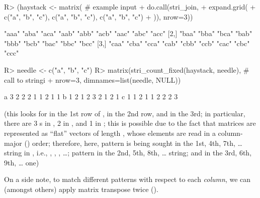 \documentclass[nojss]{jss}
\begin{document}
\begin{itemize}
\begin{Schunk}
\begin{Sinput}
R> (haystack <- matrix(  # example input
+    do.call(stri_join,
+      expand.grid(
+        c("a", "b", "c"), c("a", "b", "c"), c("a", "b", "c")
+      )), nrow=3))
\end{Sinput}
\begin{Soutput}
     [,1]  [,2]  [,3]  [,4]  [,5]  [,6]  [,7]  [,8]  [,9]
[1,] "aaa" "aba" "aca" "aab" "abb" "acb" "aac" "abc" "acc"
[2,] "baa" "bba" "bca" "bab" "bbb" "bcb" "bac" "bbc" "bcc"
[3,] "caa" "cba" "cca" "cab" "cbb" "ccb" "cac" "cbc" "ccc"
\end{Soutput}
\begin{Sinput}
R> needle <- c("a", "b", "c")
R> matrix(stri_count_fixed(haystack, needle),  # call to stringi
+    nrow=3, dimnames=list(needle, NULL))
\end{Sinput}
\begin{Soutput}
  [,1] [,2] [,3] [,4] [,5] [,6] [,7] [,8] [,9]
a    3    2    2    2    1    1    2    1    1
b    1    2    1    2    3    2    1    2    1
c    1    1    2    1    1    2    2    2    3
\end{Soutput}
\end{Schunk}

(this looks for  in the 1st row of
,  in the 2nd row, and  in the 3rd;
in particular, there are 3 s in , 2 in ,
and 1  in ;
this is possible due to the fact that matrices are
represented as ``flat'' vectors of length ,
whose elements are read in a column-major () order;
therefore, here,
pattern  is being sought in the 1st, 4th, 7th,
\dots{} string in , i.e., , , , \dots;
pattern  in the 2nd, 5th, 8th, \dots{} string;
and  in the 3rd, 6th, 9th, \dots{} one)

\medskip
On a side note, to match different patterns
with respect to each \textit{column}, we can (amongst others)
apply matrix transpose twice ().


%
%
%
%


\end{itemize}
\end{document}
